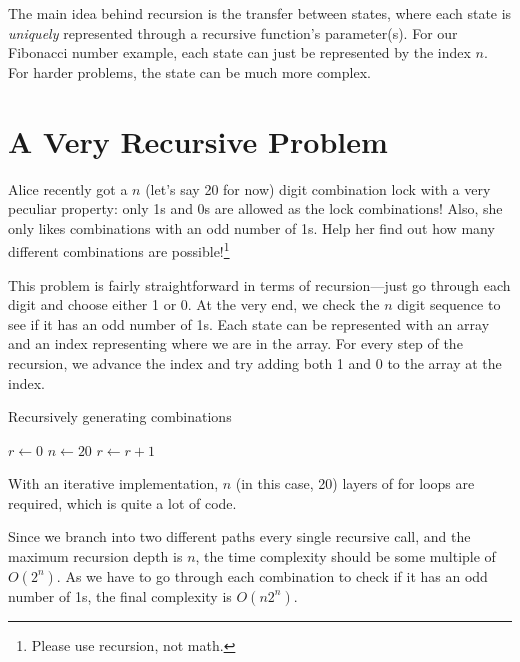 \documentclass{article}
\begin{document}
    The main idea behind recursion is the transfer between states, where each state is \textit{uniquely} represented through a recursive function's parameter(s). For our Fibonacci number example, each state can just be represented by the index $n$. For harder problems, the state can be much more complex.

    \section{A Very Recursive Problem}
    Alice recently got a $n$ (let's say 20 for now) digit combination lock with a very peculiar property: only 1s and 0s are allowed as the lock combinations! Also, she only likes combinations with an odd number of 1s. Help her find out how many different combinations are possible!\footnote{Please use recursion, not math.}

    This problem is fairly straightforward in terms of recursion---just go through each digit and choose either 1 or 0. At the very end, we check the $n$ digit sequence to see if it has an odd number of 1s. Each state can be represented with an array and an index representing where we are in the array. For every step of the recursion, we advance the index and try adding both 1 and 0 to the array at the index.

    \begin{algorithm}
        \caption{Recursively generating combinations}
        \begin{algorithmic}[1]
            \State $r \gets 0$
            \State $n \gets 20$
                        \State $r \gets r + 1$
                    \EndIf
                \Else
                    \State {}
                    \State {}
                \EndIf
            \EndFunction
            \State {}
        \end{algorithmic}
    \end{algorithm}

    With an iterative implementation, $n$ (in this case, 20) layers of for loops are required, which is quite a lot of code.

    Since we branch into two different paths every single recursive call, and the maximum recursion depth is $n$, the time complexity should be some multiple of $O(2^n)$. As we have to go through each combination to check if it has an odd number of 1s, the final complexity is $O(n2^n)$.
\end{document}
